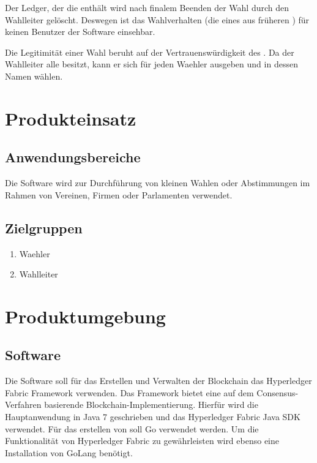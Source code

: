 \documentclass[parskip=full,11pt,twoside]{scrartcl}
\begin{document}
Der \gls{Ledger}, der die  enthält wird nach finalem Beenden der \gls{Wahl} durch den \gls{Wahlleiter} gelöscht.
Deswegen ist das Wahlverhalten (die  eines  aus früheren ) für keinen Benutzer der Software einsehbar. 

Die Legitimität einer \gls{Wahl} beruht auf der Vertrauenswürdigkeit des . Da der \gls{Wahlleiter} alle  besitzt, kann er sich für jeden \gls{Waehler} ausgeben und in dessen Namen wählen.
\section{Produkteinsatz}

\subsection{Anwendungsbereiche}
Die Software wird zur Durchführung von kleinen Wahlen oder Abstimmungen im Rahmen von Vereinen, Firmen oder Parlamenten verwendet.

\subsection{Zielgruppen}
\begin{enumerate}
  \item \gls{Waehler}
  \item \gls{Wahlleiter}
\end{enumerate}

\section{Produktumgebung}

\subsection{Software}
Die Software soll für das Erstellen und Verwalten der \gls{Blockchain} das Hyperledger Fabric Framework verwenden. Das Framework bietet eine auf dem Consensus-Verfahren basierende Blockchain-Implementierung.
Hierfür wird die Hauptanwendung in Java 7 geschrieben und das Hyperledger Fabric Java SDK verwendet. Für das erstellen von  soll Go verwendet werden.
Um die Funktionalität von Hyperledger Fabric zu gewährleisten wird ebenso eine Installation von GoLang benötigt.
\end{document}
